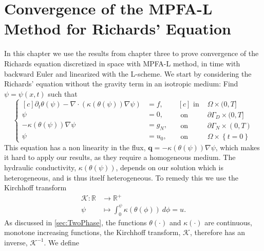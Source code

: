 \documentclass[../Main/main.tex]{subfiles}
\begin{document}
	\graphicspath{{../Time dependent equations/figs/}}
	\chapter{Convergence of the MPFA-L Method for Richards' Equation}
	In this chapter we use the results from chapter three to prove convergence of the Richards equation discretized in space with MPFA-L method, in time with backward Euler and linearized with the L-scheme.
	We start by considering the Richards' equation without the gravity term in an isotropic medium: Find $\psi = \psi(x,t)$ such that
	\begin{equation}\label{eq:richards w bc}
		\left \{
		\begin{aligned}[c]
			\partial_t \theta(\psi) - \nabla \cdot \left (\kappa(\theta (\psi)) \nabla \psi \right ) &= f, \\
			\psi &= 0, \\
			-\kappa(\theta (\psi)) \nabla \psi &= g_N,\\
			\psi &= u_0,
		\end{aligned}
		\ \ \
		\begin{aligned}[c]
			\text{ in }& \Omega \times (0,T]\\
			\text{ on }& \partial \Gamma_D \times (0,T]\\
			\text{ on }& \partial \Gamma_N \times (0,T)\\
			\text{ on }& \Omega \times \left\{t=0\right \}
		\end{aligned}
		\right.
	\end{equation}
	This equation has a non linearity in the flux, $\bm{q}=-\kappa(\theta (\psi)) \nabla \psi$, which makes it hard to apply our results, as they require a homogeneous medium. The hydraulic conductivity, $\kappa(\theta (\psi))$, depends on our solution which is heterogeneous, and is thus itself heterogeneous.
	To remedy this we use the Kirchhoff transform 
	\begin{equation}
		\begin{aligned}
			\mathcal{K} :\mathbb{R} &\rightarrow \mathbb{R}^{+}\\
			\psi &\mapsto \int_{0}^{\psi} \kappa(\theta(\phi)) \ d \phi = u.
		\end{aligned}
	\end{equation}
	As discussed in \ref{sec:TwoPhase}, the functions $\theta(\cdot)$ and $\kappa(\cdot)$ are continuous, monotone increasing functions, the Kirchhoff transform, $\mathcal{K}$, therefore has an inverse, $\mathcal{K}^{-1}$. 
	We define
\end{document}
